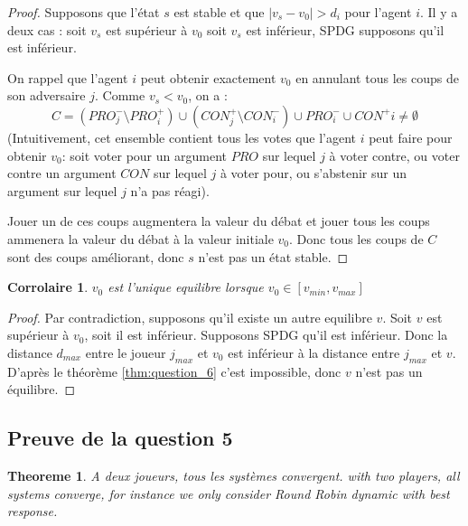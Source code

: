 \documentclass[12pt]{article}
\newtheorem{theoreme}{Theoreme}[section]
\newtheorem{corollary}{Corrolaire}[section]
\theoremstyle{defi}
\theoremstyle{not}
\theoremstyle{prob}
\begin{document}
    \begin{proof}
      Supposons que l'état $s$ est stable et que $|v_s - v_0| > d_i$ pour l'agent $i$.
      Il y a deux cas : soit $v_s$ est supérieur à $v_0$ soit $v_s$ est inférieur, SPDG supposons qu'il est inférieur.

      On rappel que l'agent $i$ peut obtenir exactement $v_0$ en annulant tous les coups de son adversaire $j$.
      Comme $v_s<v_0$, on a :
      $$
      C = (PRO^-_j \setminus PRO^+_i) \cup (CON^+_j \setminus CON^-_i) \cup PRO^-_i \cup CON^+i \not = \emptyset
      $$
      (Intuitivement, cet ensemble contient tous les votes que l'agent $i$ peut faire pour obtenir $v_0$: soit voter pour un argument $PRO$ sur lequel $j$ à voter contre, ou voter contre un argument $CON$ sur lequel $j$ à voter pour, ou s'abstenir sur un argument sur lequel $j$ n'a pas réagi).

      Jouer un de ces coups augmentera la valeur du débat et jouer tous les coups ammenera la valeur du débat à la valeur initiale $v_0$. Donc tous les coups de $C$ sont des coups améliorant, donc $s$ n'est pas un état stable.
    \end{proof}

    \begin{corollary}
      $v_0$ est l'\emph{unique} equilibre lorsque $v_0 \in [v_{min},v_{max}]$
    \end{corollary}

    \begin{proof}
      Par contradiction, supposons qu'il existe un autre equilibre $v$.
      Soit $v$ est supérieur à $v_0$, soit il est inférieur.
      Supposons SPDG qu'il est inférieur.
      Donc la distance $d_{max}$ entre le joueur $j_{max}$ et $v_0$ est inférieur à la distance entre $j_{max}$ et $v$.
      D'après le théorème \ref{thm:question_6} c'est impossible, donc $v$ n'est pas un équilibre.
    \end{proof}

    \subsection{Preuve de la question 5}

      \begin{theoreme}
        \label{thm:question_5}
        A deux joueurs, tous les systèmes convergent.
        with two players, all systems converge, for instance we only consider Round Robin dynamic with best response.
      \end{theoreme}
\end{document}
